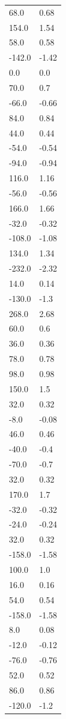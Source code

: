 \begin{longtable}{ll}
68.0 & 0.68 \\
154.0 & 1.54 \\
58.0 & 0.58 \\
-142.0 & -1.42 \\
0.0 & 0.0 \\
70.0 & 0.7 \\
-66.0 & -0.66 \\
84.0 & 0.84 \\
44.0 & 0.44 \\
-54.0 & -0.54 \\
-94.0 & -0.94 \\
116.0 & 1.16 \\
-56.0 & -0.56 \\
166.0 & 1.66 \\
-32.0 & -0.32 \\
-108.0 & -1.08 \\
134.0 & 1.34 \\
-232.0 & -2.32 \\
14.0 & 0.14 \\
-130.0 & -1.3 \\
268.0 & 2.68 \\
60.0 & 0.6 \\
36.0 & 0.36 \\
78.0 & 0.78 \\
98.0 & 0.98 \\
150.0 & 1.5 \\
32.0 & 0.32 \\
-8.0 & -0.08 \\
46.0 & 0.46 \\
-40.0 & -0.4 \\
-70.0 & -0.7 \\
32.0 & 0.32 \\
170.0 & 1.7 \\
-32.0 & -0.32 \\
-24.0 & -0.24 \\
32.0 & 0.32 \\
-158.0 & -1.58 \\
100.0 & 1.0 \\
16.0 & 0.16 \\
54.0 & 0.54 \\
-158.0 & -1.58 \\
8.0 & 0.08 \\
-12.0 & -0.12 \\
-76.0 & -0.76 \\
52.0 & 0.52 \\
86.0 & 0.86 \\
-120.0 & -1.2 \\

\end{longtable}
